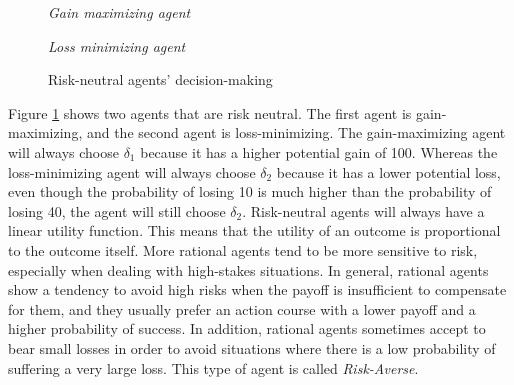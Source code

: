 \begin{figure}[H]
    \centering
    \begin{minipage}{.5\textwidth}
      \centering
        
        \textit{Gain maximizing agent}
    \end{minipage}%
    \begin{minipage}{.5\textwidth}
      \centering
        
        \textit{Loss minimizing agent}
    \end{minipage}
    \caption{Risk-neutral agents' decision-making}
    \label{fig:risk-neutral}
\end{figure}

Figure \ref{fig:risk-neutral} shows two agents that are risk neutral. The first agent is gain-maximizing, and the second agent is loss-minimizing. The gain-maximizing agent will always choose $\delta_1$ because it has a higher potential gain of 100. Whereas the loss-minimizing agent will always choose $\delta_2$ because it has a lower potential loss, even though the probability of losing 10 is much higher than the probability of losing 40, the agent will still choose $\delta_2$. Risk-neutral agents will always have a linear utility function. This means that the utility of an outcome is proportional to the outcome itself. More rational agents tend to be more sensitive to risk, especially when dealing with high-stakes situations. In general, rational agents show a tendency to avoid high risks when the payoff is insufficient to compensate for them, and they usually prefer an action course with a lower payoff and a higher probability of success. In addition, rational agents sometimes accept to bear small losses in order to avoid situations where there is a low probability of suffering a very large loss. This type of agent is called \textit{Risk-Averse}.

